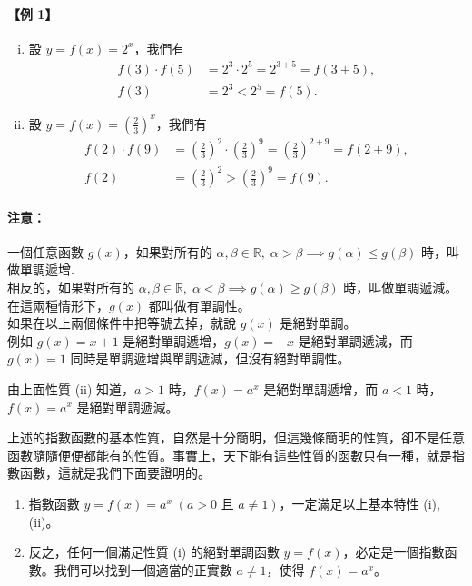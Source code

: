 \paragraph{【例 1】}
\begin{enumerate}[(i)]
    \item 設 $y = f(x) = 2^x$，我們有
    \begin{align*}
    f(3)\cdot f(5) &= 2^3 \cdot 2^5 = 2^{3+5} = f(3+5), \\
    f(3) &= 2^3 < 2^5 = f(5).
    \end{align*}
    \item 設 $y = f(x) = \left(\frac{2}{3}\right)^x$，我們有
    \begin{align*}
    f(2)\cdot f(9) &= \left(\frac{2}{3}\right)^2 \cdot \left(\frac{2}{3}\right)^9 = \left(\frac{2}{3}\right)^{2+9} = f(2+9), \\
    f(2) &= \left(\frac{2}{3}\right)^2 > \left(\frac{2}{3}\right)^9 = f(9).
    \end{align*}
\end{enumerate}

\paragraph{注意：} 一個任意函數 $g(x)$，如果對所有的 $\alpha, \beta \in \mathbb{R},\; \alpha > \beta \implies g(\alpha) \le g(\beta)$ 時，叫做單調遞增\label{note:b2-ch4-p91-monotonicity}. \\
相反的，如果對所有的 $\alpha, \beta \in \mathbb{R},\; \alpha < \beta \implies g(\alpha) \ge g(\beta)$ 時，叫做單調遞減。\\
在這兩種情形下，$g(x)$ 都叫做有單調性。\\
如果在以上兩個條件中把等號去掉，就說 $g(x)$ 是絕對單調。\\
例如 $g(x) = x+1$ 是絕對單調遞增，$g(x) = -x$ 是絕對單調遞減，而 $g(x) = 1$ 同時是單調遞增與單調遞減，但沒有絕對單調性。

由上面性質 (ii) 知道，$a > 1$ 時，$f(x) = a^x$ 是絕對單調遞增，而 $a < 1$ 時，$f(x) = a^x$ 是絕對單調遞減。

上述的指數函數的基本性質，自然是十分簡明，但這幾條簡明的性質，卻不是任意函數隨隨便便都能有的性質。事實上，天下能有這些性質的函數只有一種，就是指數函數，這就是我們下面要證明的。

\begin{theorem}[指數函數的基本定理]
\begin{enumerate}
    \item[(甲)] 指數函數 $y = f(x) = a^x\; (a > 0 \text{ 且 } a \neq 1)$，一定滿足以上基本特性 (i), (ii)。
    \item[(乙)] 反之，任何一個滿足性質 (i) 的絕對單調函數 $y = f(x)$，必定是一個指數函數。我們可以找到一個適當的正實數 $a \neq 1$，使得 $f(x) = a^x$。
\end{enumerate}
\end{theorem}
